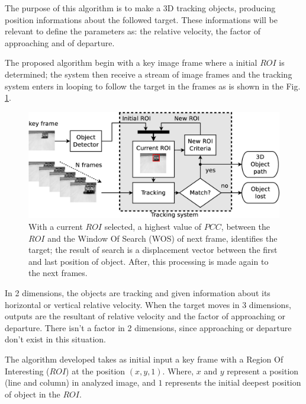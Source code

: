 The purpose of this algorithm is to make a 3D tracking objects, producing position informations 
about the followed target.
These informations will be relevant to define the parameters 
as: the relative velocity, the factor of approaching and of departure.

The proposed algorithm begin with a key image frame where a initial $ROI$ is determined; 
the system then receive a stream of image frames and the tracking system 
enters in looping to follow the target in the frames as is shown in the Fig. \ref{fig:system}.


\begin{figure}[bhp]
\includegraphics[width=\columnwidth]{images/figure1-diagram1.eps}
\caption{With a current $ROI$ selected, a highest value of $PCC$, between the $ROI$ 
and the Window Of Search (WOS) of next frame, identifies the target; 
the result of search is a displacement vector
between the first and last position of object. 
After, this processing is made again to the next frames.}
\label{fig:system}
\end{figure}

In 2 dimensions, the objects are tracking and given information about its horizontal 
or vertical relative velocity.
When the target moves in 3 dimensions, outputs are the resultant of relative 
velocity and the factor of approaching or departure. 
There isn't a factor in 2 dimensions, since approaching or departure don't exist 
in this situation.

The algorithm developed takes as initial input a key frame with a Region Of 
Interesting ($ROI$) at the position $(x,y,1)$.
Where, $x$ and $y$ represent a position (line and column) in analyzed image,
and $1$ represents the initial deepest position of object in the $ROI$.

